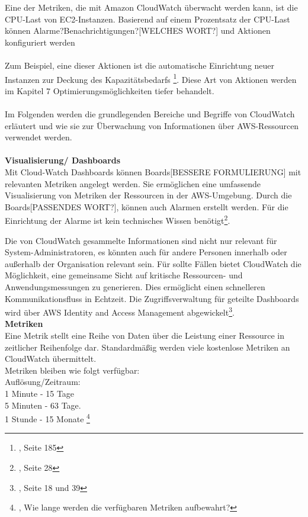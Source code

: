 Eine der Metriken, die mit Amazon CloudWatch überwacht werden kann, ist die CPU-Last von EC2-Instanzen. 
Basierend auf einem Prozentsatz der CPU-Last können Alarme?Benachrichtigungen?[WELCHES WORT?] und Aktionen konfiguriert werden
\\\\
Zum Beispiel, eine dieser Aktionen ist die automatische Einrichtung neuer Instanzen zur Deckung des Kapazitätsbedarfs
\footnote{\cite{AWS1}, Seite 185}. 
Diese Art von Aktionen werden im Kapitel 7 Optimierungsmöglichkeiten tiefer behandelt.
\\\\
Im Folgenden werden die grundlegenden Bereiche und Begriffe von CloudWatch erläutert und wie sie zur Überwachung von Informationen über AWS-Ressourcen verwendet werden.
\\\\
\textbf{Visualisierung/ Dashboards}\\
Mit Cloud-Watch Dashboards können Boards[BESSERE FORMULIERUNG] mit relevanten Metriken angelegt werden. Sie ermöglichen eine umfassende Visualisierung von Metriken der Ressourcen in der AWS-Umgebung. Durch die Boards[PASSENDES WORT?], können auch Alarmen erstellt werden. Für die Einrichtung der Alarme ist kein technisches Wissen benötigt\footnote{\cite{AMZ14}, Seite 28}.

Die von CloudWatch gesammelte Informationen sind nicht nur relevant für System-Administratoren, es könnten auch für andere Personen innerhalb oder außerhalb der Organisation relevant sein.
Für sollte Fällen bietet CloudWatch die Möglichkeit, eine gemeinsame Sicht auf kritische Ressourcen- und Anwendungsmessungen zu generieren. 
Dies ermöglicht einen schnelleren Kommunikationsfluss in Echtzeit. Die Zugriffsverwaltung für geteilte Dashboards wird über AWS Identity and Access Management abgewickelt\footnote{\cite{AMZ14}, Seite 18 und 39}.
\\

\textbf{Metriken} \\
Eine Metrik stellt eine Reihe von Daten über die Leistung einer Ressource in zeitlicher Reihenfolge dar. Standardmäßig werden viele kostenlose Metriken an CloudWatch übermittelt.
\\
Metriken bleiben wie folgt verfügbar:\\
Auflösung/Zeitraum: \\
1 Minute - 15 Tage\\
5 Minuten - 63 Tage.\\
1 Stunde - 15 Monate 
\footnote{\cite{AMZ15}, Wie lange werden die verfügbaren Metriken aufbewahrt?}

